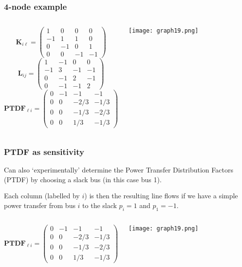 \documentclass[10pt,dvipsnames]{beamer}
\begin{document}
\begin{frame}
  \frametitle{4-node example}

  \begin{columns}
\begin{equation*}
\mathbf{K}_{i \ell}=\left(\begin{matrix}
1 & 0 & 0 & 0\\
-1 & 1 & 1 & 0\\
0 & -1 & 0 & 1\\
0 & 0 & -1 & -1
\end{matrix}\right)
\end{equation*}
\begin{equation*}
\mathbf{L}_{ij}=\left(\begin{matrix}
1 & -1 & 0 & 0\\
-1 & 3 & -1 & -1\\
0 & -1 & 2 & -1\\
0 & -1 & -1 & 2
\end{matrix}\right)
\end{equation*}
\begin{equation*}
\mathbf{PTDF}_{\ell i}=\left(\begin{matrix}
0 & -1 & -1 & -1\\
0 & 0 & -2/3 & -1/3\\
0 & 0 & -1/3 & -2/3\\
0 & 0 & 1/3 & -1/3
\end{matrix}\right)
\end{equation*}

\texttt{[image: graph19.png]}
\end{columns}


\end{frame}



\begin{frame}
  \frametitle{PTDF as sensitivity}

  Can also `experimentally' determine the Power Transfer Distribution
  Factors (PTDF) by choosing a slack bus (in this case bus 1).

  Each column (labelled by $i$) is then the resulting line flows if we have
  a simple power transfer from bus $i$ to the slack $p_i = 1$ and $p_1
  = -1$.

  \begin{columns}
\begin{equation*}
\mathbf{PTDF}_{\ell i}=\left(\begin{matrix}
0 & -1 & -1 & -1\\
0 & 0 & -2/3 & -1/3\\
0 & 0 & -1/3 & -2/3\\
0 & 0 & 1/3 & -1/3
\end{matrix}\right)
\end{equation*}

\texttt{[image: graph19.png]}
\end{columns}


\end{frame}
\end{document}
